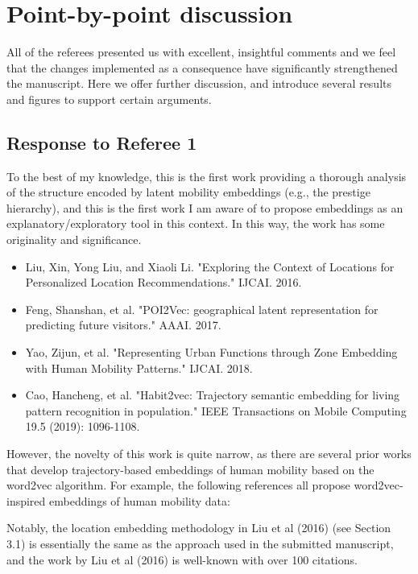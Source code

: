 \documentclass[12pt,a4paper]{article}
\newcommand{\rcomment}[1]{%
\vspace{10pt}
\begin{tcolorbox}[colback=black!3,colframe=white!45!black, left=0pt, right=0pt, top=0pt, bottom=0pt, arc=0pt,outer arc=0pt, grow to left by=-0.5cm,grow to right by=-0.5cm]
#1
\end{tcolorbox}
}
\begin{document}
%
%
\section{Point-by-point discussion}
All of the referees presented us with excellent, insightful comments and we feel that the changes implemented as a consequence have signiﬁcantly strengthened the manuscript. Here we offer further discussion, and introduce several results and figures to support certain arguments.

\subsection{Response to Referee 1}


\rcomment{%
To the best of my knowledge, this is the first work providing a thorough analysis of the structure encoded by latent mobility embeddings (e.g., the prestige hierarchy), and this is the first work I am aware of to propose embeddings as an explanatory/exploratory tool in this context. In this way, the work has some originality and significance.

\begin{itemize}
	\item Liu, Xin, Yong Liu, and Xiaoli Li. "Exploring the Context of Locations for Personalized Location Recommendations." IJCAI. 2016.
\item Feng, Shanshan, et al. "POI2Vec: geographical latent representation for predicting future visitors." AAAI. 2017.
\item Yao, Zijun, et al. "Representing Urban Functions through Zone Embedding with Human Mobility Patterns." IJCAI. 2018.
\item Cao, Hancheng, et al. "Habit2vec: Trajectory semantic embedding for living pattern recognition in population." IEEE Transactions on Mobile Computing 19.5 (2019): 1096-1108.
\end{itemize}


However, the novelty of this work is quite narrow, as there are several prior works that develop trajectory-based embeddings of human mobility based on the word2vec algorithm. For example, the following references all propose word2vec-inspired embeddings of human mobility data:


Notably, the location embedding methodology in Liu et al (2016) (see Section 3.1) is essentially the same as the approach used in the submitted manuscript, and the work by Liu et al (2016) is well-known with over 100 citations.
}
\end{document}
